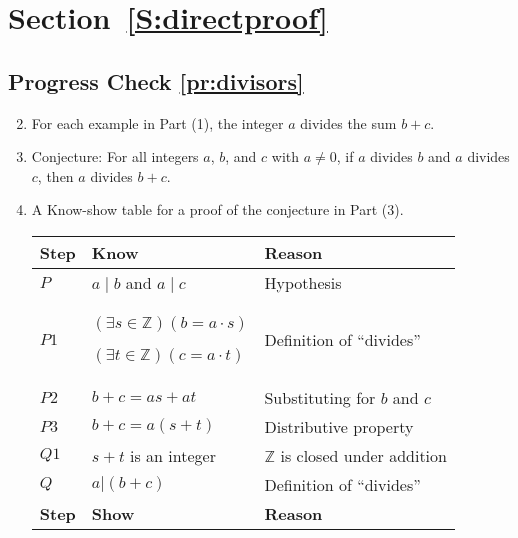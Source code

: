 \section*{Section~\ref{S:directproof}}


\subsection*{Progress Check \ref{pr:divisors}}
\begin{enumerate} \setcounter{enumi}{1}
%

\item For each example in Part (1), the integer  $a$  divides the sum  $b + c$.

\item Conjecture:  For all integers $a$, $b$, and  $c$  with $a \ne 0$,  if $a$  divides  $b$  and  $a$  divides  $c$, then  $a$  divides  $b + c$.

\item A Know-show table for a proof of the conjecture in Part (3).
\begin{center}
\begin{tabular}[h]{|p{0.4in}|p{2in}|p{1.8in}|}
  \hline
  \textbf{Step}  &  \textbf{Know}  &  \textbf{Reason}     \\ \hline
  $P$     &  $a \mid b$ and  $a \mid c$     &  Hypothesis \\ \hline
  $P1$    &  $\left( {\exists s \in \mathbb{Z}} \right)\left( {b = a \cdot s} \right)$

$\left( {\exists t \in \mathbb{Z}} \right)\left( {c = a \cdot t} \right)$                               &  Definition of ``divides''           \\ \hline
  $P2$    &     $b + c = as + at$     & Substituting for $b$ and $c$   \\  \hline
  $P3$    &     $b + c = a\left( {s + t} \right)$     & Distributive property   \\  \hline  
  $Q1$    &     $s + t$ is an integer     & $\mathbb{Z}$ is closed under addition   \\  \hline  
  
  $Q$     &  $\left. {a } \right| \left( {b + c} \right)$  &  Definition of ``divides''    \\ \hline
  \textbf{Step}  &  \textbf{Show}  &  \textbf{Reason}     \\ \hline
\end{tabular}
\end{center}
\end{enumerate}


